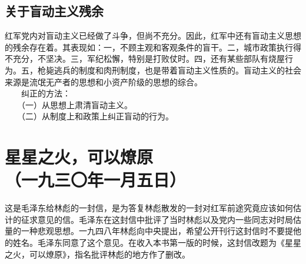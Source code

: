 \documentclass[cn,11pt,chinese]{elegantbook}
\def\myformat#1{\hfil\hfil #1}
\begin{document}
\subsection*{\myformat{关于盲动主义残余}}
红军党内对盲动主义已经做了斗争，但尚不充分。因此，红军中还有盲动主义思想的残余存在着。其表现如：一，不顾主观和客观条件的盲干。二，城市政策执行得不充分，不坚决。三，军纪松懈，特别是打败仗时。四，还有某些部队有烧屋行为。五，枪毙逃兵的制度和肉刑制度，也是带着盲动主义性质的。盲动主义的社会来源是流氓无产者的思想和小资产阶级的思想的综合。\\
　　纠正的方法：\\
　　（一）从思想上肃清盲动主义。\\
　　（二）从制度上和政策上纠正盲动的行为。\\
\newpage\section*{\myformat{星星之火，可以燎原}\\\myformat{（一九三〇年一月五日）}}
\begin{introduction}\item  这是毛泽东给林彪的一封信，是为答复林彪散发的一封对红军前途究竟应该如何估计的征求意见的信。毛泽东在这封信中批评了当时林彪以及党内一些同志对时局估量的一种悲观思想。一九四八年林彪向中央提出，希望公开刊行这封信时不要提他的姓名。毛泽东同意了这个意见。在收入本书第一版的时候，这封信改题为《星星之火，可以燎原》，指名批评林彪的地方作了删改。\end{introduction}
\end{document}
